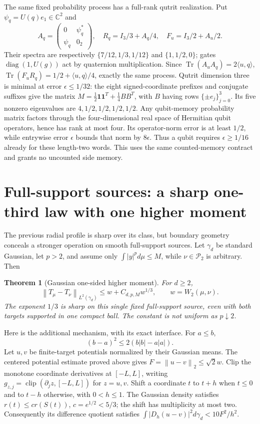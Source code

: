 \documentclass[11pt]{article}
\newtheorem{theorem}{Theorem}
\newcommand{\Tr}{\operatorname{Tr}}
\newcommand{\norm}[1]{\left\lVert#1\right\rVert}
\begin{document}
The same fixed probability process has a full-rank qutrit realization. Put $\psi_q=U(q)e_1\in\mathbb C^2$ and
\[
A_q=\begin{pmatrix}0&\psi_q^*\\\psi_q&0_2\end{pmatrix},\quad
R_q=I_3/3+A_q/4,\quad F_u=I_3/2+A_u/2.
\]
Their spectra are respectively $\{7/12,1/3,1/12\}$ and $\{1,1/2,0\}$; gates $\operatorname{diag}(1,U(g))$ act by quaternion multiplication. Since $\Tr(A_uA_q)=2\langle u,q\rangle$, $\Tr(F_uR_q)=1/2+\langle u,q\rangle/4$, exactly the same process. Qutrit dimension three is minimal at error $\epsilon\le1/32$: the eight signed-coordinate prefixes and conjugate suffixes give the matrix $M=\tfrac12\mathbf1\mathbf1^T+\tfrac14BB^T$, with $B$ having rows $\{\pm e_j\}_{j=0}^3$. Its five nonzero eigenvalues are $4,1/2,1/2,1/2,1/2$. Any qubit-memory probability matrix factors through the four-dimensional real space of Hermitian qubit operators, hence has rank at most four. Its operator-norm error is at least $1/2$, while entrywise error $\epsilon$ bounds that norm by $8\epsilon$. Thus a qubit requires $\epsilon\ge1/16$ already for these length-two words. This uses the same counted-memory contract and grants no uncounted side memory.

\section{Full-support sources: a sharp one-third law with one higher moment}

The previous radial profile is sharp over its class, but boundary geometry conceals a stronger operation on smooth full-support sources. Let $\gamma_d$ be standard Gaussian, let $p>2$, and assume only $\int|y|^p d\mu\le M$, while $\nu\in\mathcal P_2$ is arbitrary. Then
\begin{theorem}[Gaussian one-sided higher moment]\label{thm:gaussian}
For $d\ge2$,
\[
\norm{T_\mu-T_\nu}_{L^2(\gamma_d)}\le w+C_{d,p,M}w^{1/3},\qquad w=W_2(\mu,\nu).
\tag{G1}
\]
The exponent $1/3$ is sharp on this single fixed full-support source, even with both targets supported in one compact ball. The constant is not uniform as $p\downarrow2$.
\end{theorem}

Here is the additional mechanism, with its exact interface. For $a\le b$,
\[
(b-a)^2\le2(b|b|-a|a|).
\tag{G2}
\]
Let $u,v$ be finite-target potentials normalized by their Gaussian means. The centered potential estimate proved above gives $F=\norm{u-v}_2\le\sqrt2w$. Clip the monotone coordinate derivatives at $[-L,L]$, writing $g_{z,j}=\operatorname{clip}(\partial_jz,[-L,L])$ for $z=u,v$. Shift a coordinate $t$ to $t+h$ when $t\le0$ and to $t-h$ otherwise, with $0<h\le1$. The Gaussian density satisfies $r(t)\le cr(S(t))$, $c=e^{1/2}<5/3$; the shift has multiplicity at most two. Consequently its difference quotient satisfies $\int|D_h(u-v)|^2d\gamma_d<10F^2/h^2$.
\end{document}
